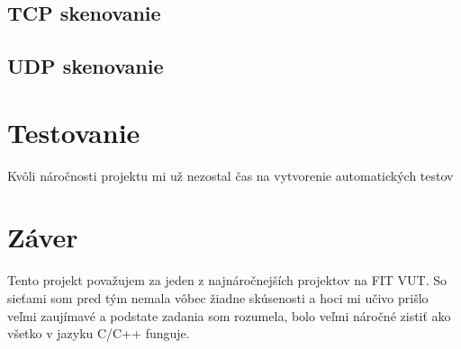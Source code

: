 \documentclass[11pt, a4paper]{article}
\begin{document}
\subsection{TCP skenovanie}

\subsection{UDP skenovanie}

\section{Testovanie}
Kvôli náročnosti projektu mi už nezostal čas na vytvorenie automatických testov 

\section{Záver}
Tento projekt považujem za jeden z najnáročnejších projektov na FIT VUT. So sieťami som pred tým nemala vôbec žiadne skúsenosti a hoci mi učivo prišlo veľmi zaujímavé a podstate zadania som rozumela, bolo veľmi náročné zistiť ako všetko v jazyku C/C++ funguje.

\newpage

\renewcommand{\refname}{Použitá literatúra}

\end{document}

